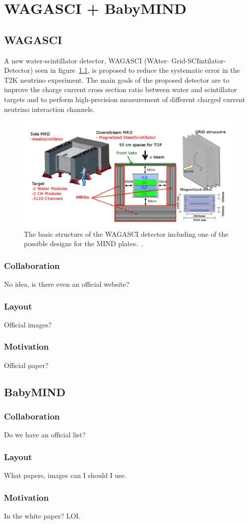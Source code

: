 \chapter{WAGASCI + BabyMIND}
\label{c:WAGASCI}

\section{WAGASCI}

A new water-scintillator detector, WAGASCI (WAter- Grid-SCIintilator-Detector) seen in figure~\ref{fig:WAGASCI}, is proposed to reduce the systematic error in the T2K neutrino experiment.
The main goals of the proposed detector are to improve the charge current cross section ratio between water and scintillator targets and to perform high-precision measurement of different charged current neutrino interaction channels.

\begin{figure}[h!]
\centering
\includegraphics[width=\textwidth]{figures/WAGASCI.png}
\caption{The basic structure of the WAGASCI detector including one of the possible designs for the MIND plates.~\cite{30WAGASCI}.}
\label{fig:WAGASCI}
\end{figure}


\subsection{Collaboration}
No idea, is there even an official website?
\subsection{Layout}
Official images?
\subsection{Motivation}
Official paper?

\section{BabyMIND}
\subsection{Collaboration}
Do we have an official list?
\subsection{Layout}
What papers, images can I should I use.
\subsection{Motivation}
In the white paper? LOI.